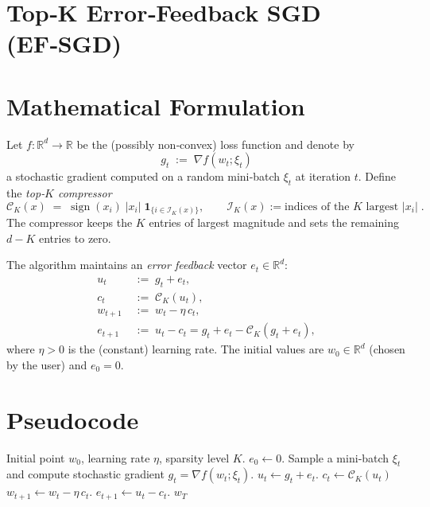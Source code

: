 \documentclass{article}
\newcommand{\R}{\mathbb{R}}
\newcommand{\topk}{\mathcal{C}_{K}}
\begin{document}
\section*{Top‑K Error‑Feedback SGD (EF‑SGD)}

\section*{Mathematical Formulation}
Let $f:\R^{d}\rightarrow\R$ be the (possibly non‑convex) loss function and denote by
\[
g_{t}\;:=\;\nabla f(w_{t};\xi_{t})
\]
a stochastic gradient computed on a random mini‑batch $\xi_{t}$ at iteration $t$.
Define the \emph{top‑$K$ compressor}
\[
\topk(x)\;=\; \operatorname{sign}(x_{i})\;|x_{i}|\;\mathbf{1}_{\{i\in\mathcal{I}_{K}(x)\}},
\qquad 
\mathcal{I}_{K}(x):=\text{indices of the $K$ largest }|x_{i}|\; .
\]
The compressor keeps the $K$ entries of largest magnitude and sets the remaining $d-K$ entries to zero.

The algorithm maintains an \emph{error feedback} vector $e_{t}\in\R^{d}$:
\[
\boxed{
\begin{aligned}
u_{t}      &\;:=\; g_{t}+e_{t},\\
c_{t}      &\;:=\;\topk(u_{t}),\\
w_{t+1}    &\;:=\; w_{t}-\eta\,c_{t},\\[2mm]
e_{t+1}    &\;:=\; u_{t}-c_{t}=g_{t}+e_{t}-\topk(g_{t}+e_{t}),
\end{aligned}}
\]
where $\eta>0$ is the (constant) learning rate.  
The initial values are $w_{0}\in\R^{d}$ (chosen by the user) and $e_{0}=0$.

\section*{Pseudocode}
\begin{algorithm}[H]
\caption{Top‑K EF‑SGD}
\begin{algorithmic}[1]
\REQUIRE Initial point $w_{0}$, learning rate $\eta$, sparsity level $K$.
\STATE $e_{0}\gets 0$.
    \STATE Sample a mini‑batch $\xi_{t}$ and compute stochastic gradient $g_{t}= \nabla f(w_{t};\xi_{t})$.
    \STATE $u_{t}\gets g_{t}+e_{t}$.
    \STATE $c_{t}\gets \topk(u_{t})$   
    \STATE $w_{t+1}\gets w_{t}-\eta\,c_{t}$.
    \STATE $e_{t+1}\gets u_{t}-c_{t}$.
\ENDFOR
\RETURN $w_{T}$
\end{algorithmic}
\end{algorithm}
\end{document}
